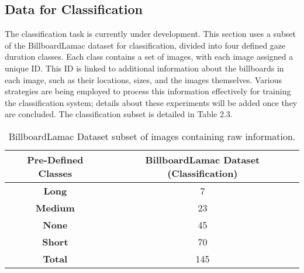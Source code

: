 \subsection{Data for Classification}\label{sec:dataclassification}

The classification task is currently under development. This section uses a subset of the BillboardLamac dataset for classification, divided into four defined gaze duration classes. Each class contains a set of images, with each image assigned a unique ID. This ID is linked to additional information about the billboards in each image, such as their locations, sizes, and the images themselves. Various strategies are being employed to process this information effectively for training the classification system; details about these experiments will be added once they are concluded. The classification subset is detailed in Table 2.3. \\

\begin{table}[h!]
\centering
\renewcommand{\arraystretch}{1.3} %
\begin{tabular}{|c|c|}
\hline
\textbf{Pre-Defined Classes} & \textbf{BillboardLamac Dataset (Classification)} \\ \hline
\textbf{Long}    & 7 \\ \hline
\textbf{Medium}  & 23  \\ \hline
\textbf{None}    & 45  \\ \hline
\textbf{Short}   & 70  \\ \hline
\textbf{Total}   & 145 \\ \hline
\end{tabular}
\caption{BillboardLamac Dataset subset of images containing raw information.}
\label{tab:lamacdataclassification}
\end{table}